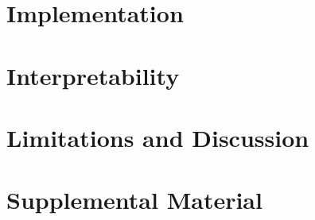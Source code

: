 \documentclass{report}
\begin{document}




\tableofcontents







\chapter{Implementation}

\chapter{Interpretability}
\chapter{Limitations and Discussion}






\chapter*{Supplemental Material}
\end{document}
